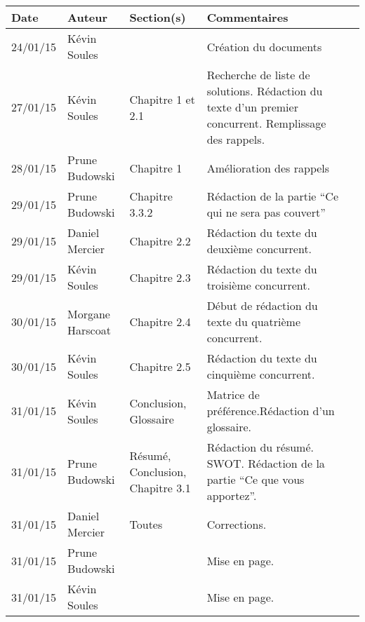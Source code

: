 \small
\begin{tabular}{|p{1.5cm}|l|p{2.5cm}|p{7.8cm}|l|}
  \hline
 
   \rowcolor{Gainsboro}Date  & Auteur & Section(s) & Commentaires \\
  \hline
24/01/15 & Kévin Soules &  & Création du documents\\
  \hline
27/01/15 & Kévin Soules & Chapitre 1 et 2.1 & Recherche de liste de solutions. Rédaction du texte d'un premier concurrent. Remplissage des rappels.\\
\hline
28/01/15 & Prune Budowski & Chapitre 1 & Amélioration des rappels \\
\hline
29/01/15 & Prune Budowski & Chapitre 3.3.2 & Rédaction de la partie ``Ce qui ne sera pas couvert''\\
\hline
29/01/15 & Daniel Mercier & Chapitre 2.2 & Rédaction du texte du deuxième concurrent.\\
\hline
29/01/15 & Kévin Soules & Chapitre 2.3 & Rédaction du texte du troisième concurrent. \\
\hline
30/01/15 & Morgane Harscoat & Chapitre 2.4 & Début de rédaction du texte du quatrième concurrent. \\
\hline
30/01/15 & Kévin Soules & Chapitre 2.5 & Rédaction du texte du cinquième concurrent.\\
\hline
31/01/15 & Kévin Soules & Conclusion, Glossaire & Matrice de préférence.Rédaction d'un glossaire. \\
\hline
31/01/15 & Prune Budowski & Résumé, Conclusion, Chapitre 3.1 & Rédaction du résumé. SWOT. Rédaction de la partie ``Ce que vous apportez''.  
  \\
\hline
31/01/15 & Daniel Mercier & Toutes & Corrections. \\
31/01/15 & Prune Budowski & & Mise en page. \\
31/01/15 & Kévin Soules & & Mise en page.
\\
  \hline
\end{tabular}
\normalsize
